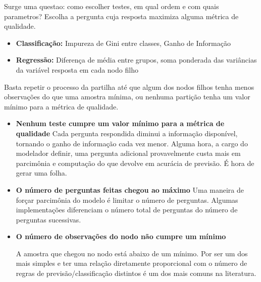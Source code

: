\documentclass{beamer} %
\newcommand{\1}{\mathbb{I}}
\begin{document}
\begin{frame}
Surge uma questao: como escolher testes, em qual ordem e com quais parametros? Escolha a pergunta cuja resposta maximiza alguma métrica de qualidade.

\begin{itemize}
    \item \textbf{Classificação:} Impureza de Gini entre classes, Ganho de Informação 
    \item \textbf{Regressão:} Diferença de média entre grupos, soma ponderada das variâncias da variável resposta em cada nodo filho
\end{itemize}

Basta repetir o processo da partilha até que algum dos nodos filhos tenha menos observações do que uma amostra mínima, ou nenhuma partição tenha um valor mínimo para a métrica de qualidade.


\end{frame}

\begin{frame}
\begin{itemize}
    \item \textbf{Nenhum teste cumpre um valor mínimo para a métrica de qualidade} \newline Cada pergunta respondida diminui a informação disponível, tornando o ganho de informação cada vez menor. Alguma hora, a cargo do modelador definir, uma pergunta adicional provavelmente custa mais em parcimônia e computação do que devolve em acurácia de previsão. É hora de gerar uma folha.
    
    \item \textbf{O número de perguntas feitas chegou ao máximo} \newline
    Uma maneira de forçar parcimônia do modelo é limitar o número de perguntas. Algumas implementações diferenciam o número total de perguntas do número de perguntas sucessivas.  
\end{itemize}
    
\end{frame}

\begin{frame} 
\begin{itemize}
   \item \textbf{O número de observações do nodo não cumpre um mínimo} \newline 
 
    A amostra que chegou no nodo está abaixo de um mínimo. Por ser um dos mais simples e ter uma relação diretamente proporcional com o número de regras de previsão/classificação distintos é um dos mais comuns na literatura.
\end{itemize}
    
\end{frame}
\end{document}
